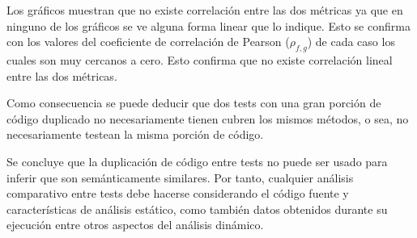 \par Los gráficos muestran que no existe correlación entre las dos métricas ya que en ninguno de los gráficos se ve alguna forma linear que lo indique. Esto se confirma con los valores del coeficiente de correlación de Pearson ($\rho_{f,g}$) de cada caso los cuales son muy cercanos a cero. Esto confirma que no existe correlación lineal entre las dos métricas.

\par Como consecuencia se puede deducir que dos tests con una gran porción de código duplicado no necesariamente tienen cubren los mismos métodos, o sea, no necesariamente testean la misma porción de código.

\par Se concluye que la duplicación de código entre tests no puede ser usado para inferir que son semánticamente similares. Por tanto, cualquier análisis comparativo entre tests debe hacerse considerando el código fuente y características de análisis estático, como también datos obtenidos durante su ejecución entre otros aspectos del análisis dinámico. 








